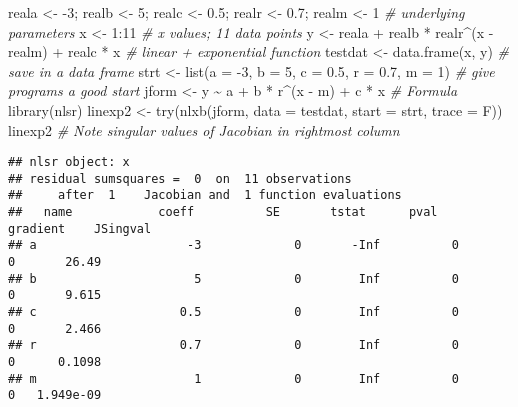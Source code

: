 \documentclass[
]{article}
\newenvironment{Shaded}{\begin{snugshade}}{\end{snugshade}}
\newcommand{\AttributeTok}[1]{\textcolor[rgb]{0.77,0.63,0.00}{#1}}
\newcommand{\CommentTok}[1]{\textcolor[rgb]{0.56,0.35,0.01}{\textit{#1}}}
\newcommand{\DecValTok}[1]{\textcolor[rgb]{0.00,0.00,0.81}{#1}}
\newcommand{\FloatTok}[1]{\textcolor[rgb]{0.00,0.00,0.81}{#1}}
\newcommand{\FunctionTok}[1]{\textcolor[rgb]{0.00,0.00,0.00}{#1}}
\newcommand{\NormalTok}[1]{#1}
\newcommand{\OtherTok}[1]{\textcolor[rgb]{0.56,0.35,0.01}{#1}}
\newcommand{\SpecialCharTok}[1]{\textcolor[rgb]{0.00,0.00,0.00}{#1}}
\begin{document}
\begin{Shaded}
\begin{Highlighting}[]
\NormalTok{reala }\OtherTok{\textless{}{-}} \SpecialCharTok{{-}}\DecValTok{3}\NormalTok{; realb }\OtherTok{\textless{}{-}} \DecValTok{5}\NormalTok{; realc }\OtherTok{\textless{}{-}} \FloatTok{0.5}\NormalTok{; realr }\OtherTok{\textless{}{-}} \FloatTok{0.7}\NormalTok{; realm }\OtherTok{\textless{}{-}} \DecValTok{1} \CommentTok{\# underlying parameters}
\NormalTok{x }\OtherTok{\textless{}{-}} \DecValTok{1}\SpecialCharTok{:}\DecValTok{11} \CommentTok{\# x values; 11 data points}
\NormalTok{y }\OtherTok{\textless{}{-}}\NormalTok{ reala }\SpecialCharTok{+}\NormalTok{ realb }\SpecialCharTok{*}\NormalTok{ realr}\SpecialCharTok{\^{}}\NormalTok{(x }\SpecialCharTok{{-}}\NormalTok{ realm) }\SpecialCharTok{+}\NormalTok{ realc }\SpecialCharTok{*}\NormalTok{ x }\CommentTok{\# linear + exponential function}
\NormalTok{testdat }\OtherTok{\textless{}{-}} \FunctionTok{data.frame}\NormalTok{(x, y) }\CommentTok{\# save in a data frame}
\NormalTok{strt }\OtherTok{\textless{}{-}} \FunctionTok{list}\NormalTok{(}\AttributeTok{a =} \SpecialCharTok{{-}}\DecValTok{3}\NormalTok{, }\AttributeTok{b =} \DecValTok{5}\NormalTok{, }\AttributeTok{c =} \FloatTok{0.5}\NormalTok{, }\AttributeTok{r =} \FloatTok{0.7}\NormalTok{, }\AttributeTok{m =} \DecValTok{1}\NormalTok{) }\CommentTok{\# give programs a good start}
\NormalTok{jform }\OtherTok{\textless{}{-}}\NormalTok{ y }\SpecialCharTok{\textasciitilde{}}\NormalTok{ a }\SpecialCharTok{+}\NormalTok{ b }\SpecialCharTok{*}\NormalTok{ r}\SpecialCharTok{\^{}}\NormalTok{(x }\SpecialCharTok{{-}}\NormalTok{ m) }\SpecialCharTok{+}\NormalTok{ c }\SpecialCharTok{*}\NormalTok{ x }\CommentTok{\# Formula}
\FunctionTok{library}\NormalTok{(nlsr)}
\NormalTok{linexp2 }\OtherTok{\textless{}{-}} \FunctionTok{try}\NormalTok{(}\FunctionTok{nlxb}\NormalTok{(jform, }\AttributeTok{data =}\NormalTok{ testdat, }\AttributeTok{start =}\NormalTok{ strt, }\AttributeTok{trace =}\NormalTok{ F))}
\NormalTok{linexp2 }\CommentTok{\# Note singular values of Jacobian in rightmost column}
\end{Highlighting}
\end{Shaded}

\begin{verbatim}
## nlsr object: x 
## residual sumsquares =  0  on  11 observations
##     after  1    Jacobian and  1 function evaluations
##   name            coeff          SE       tstat      pval      gradient    JSingval   
## a                     -3             0       -Inf          0           0       26.49  
## b                      5             0        Inf          0           0       9.615  
## c                    0.5             0        Inf          0           0       2.466  
## r                    0.7             0        Inf          0           0      0.1098  
## m                      1             0        Inf          0           0   1.949e-09
\end{verbatim}
\end{document}

